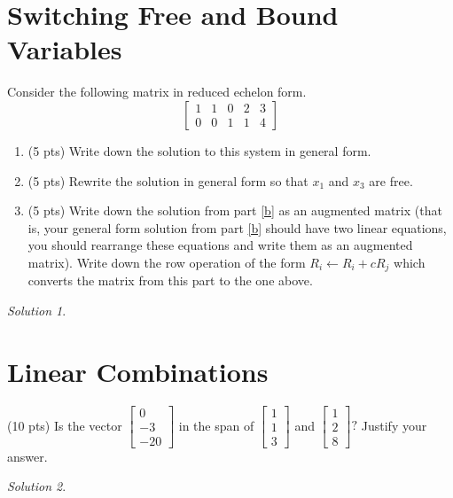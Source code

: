 \documentclass{article}
\theoremstyle{remark}
\newtheorem*{solution}{Solution}
\begin{document}
\pagebreak
\section{Switching Free and Bound Variables}
Consider the following matrix in reduced echelon form.
\begin{displaymath}
  \begin{bmatrix}
    1 & 1 & 0 & 2 & 3 \\
    0 & 0 & 1 & 1 & 4
  \end{bmatrix}
\end{displaymath}
\begin{enumerate}
\item (5 pts) Write down the solution to this system in general form.
\item\label{b} (5 pts) Rewrite the solution in general form so that $x_1$ and $x_3$ are free.
\item\label{c} (5 pts) Write down the solution from part \ref{b} as an augmented matrix (that is, your general form solution from part \ref{b} should have two linear equations, you should rearrange these equations and write them as an augmented matrix).
  Write down the row operation of the form $R_i \gets R_i + cR_j$ which converts the matrix from this part to the one above.
\end{enumerate}

\begin{solution}
\end{solution}

\pagebreak
\section{Linear Combinations}
(10 pts) Is the vector
$
\begin{bmatrix}
  0 \\ -3 \\ -20
\end{bmatrix}
$
in the span of
$
\begin{bmatrix}
  1 \\ 1 \\ 3
\end{bmatrix}
$
and
$
\begin{bmatrix}
  1 \\ 2 \\ 8
\end{bmatrix}?
$
Justify your answer.

\begin{solution}
\end{solution}
\end{document}
